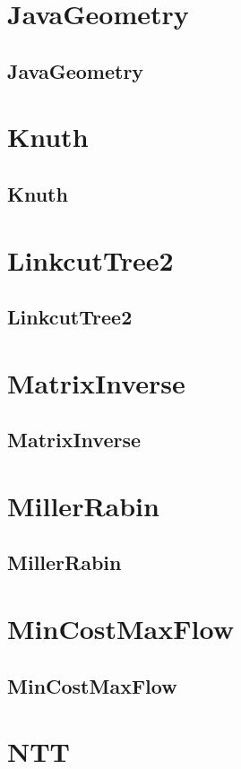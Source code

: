 \documentclass[a4paper, twocolumn]{article}
\begin{document}
\section{JavaGeometry}
\subsection{JavaGeometry}

\section{Knuth}
\subsection{Knuth}

\section{LinkcutTree2}
\subsection{LinkcutTree2}

\section{MatrixInverse}
\subsection{MatrixInverse}

\section{MillerRabin}
\subsection{MillerRabin}

\section{MinCostMaxFlow}
\subsection{MinCostMaxFlow}

\section{NTT}
\end{document}
